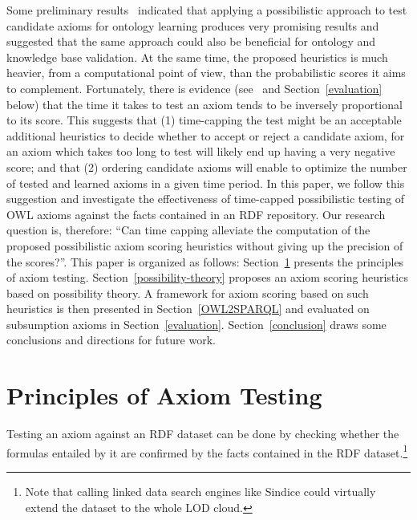 \documentclass{llncs}
\begin{document}
Some preliminary results~\cite{TettamanziFaronZuckerGandon2014ekaw} indicated that
applying a possibilistic approach to test candidate axioms
for ontology learning produces very promising results and suggested that the same approach
could also be beneficial for ontology and knowledge base validation.
At the same time, the proposed heuristics is much heavier, from a computational
point of view, than the probabilistic scores it aims to complement.
Fortunately, there is evidence (see~\cite{TettamanziFaronZuckerGandon2014ekaw} and
Section~\ref{evaluation} below) that the time it takes to test an axiom
tends to be inversely proportional to its score.
This suggests that (1) time-capping the test might be an acceptable additional heuristics
to decide whether to accept or reject a candidate axiom, for an axiom which takes
too long to test will likely end up having a very negative score; and that (2) ordering candidate axioms will enable to optimize the number of tested and learned axioms in a given time period.
In this paper, we follow this suggestion and investigate the effectiveness
of time-capped possibilistic testing of OWL axioms against the facts contained
in an RDF repository.
Our research question is, therefore: ``Can time capping alleviate the computation
of the proposed possibilistic axiom scoring heuristics without giving up
the precision of the scores?''.
This paper is organized as follows: 
Section~\ref{principles} presents the principles of axiom testing.
Section~\ref{possibility-theory}
proposes an axiom scoring heuristics based on possibility theory.
A framework for axiom scoring based on such heuristics is then presented in
Section~\ref{OWL2SPARQL} and evaluated on subsumption axioms in Section~\ref{evaluation}.
Section~\ref{conclusion} draws some conclusions and directions for future work.

\section{Principles of Axiom Testing}\label{principles}

Testing an axiom against an RDF dataset can be done by checking whether the formulas entailed by it
are confirmed by the facts contained in the RDF dataset.\footnote{Note that calling linked data search engines
like Sindice could virtually extend the dataset to the whole LOD cloud.}
\end{document}
